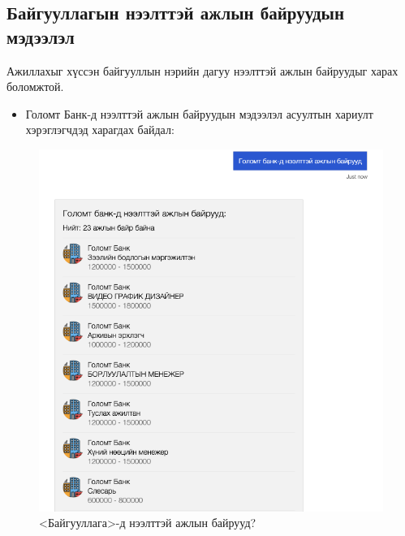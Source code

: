 \subsection{Байгууллагын нээлттэй ажлын байруудын мэдээлэл}
Ажиллахыг хүссэн байгууллын нэрийн дагуу нээлттэй ажлын байруудыг харах боломжтой.
\begin{itemize}
  \item Голомт Банк-д нээлттэй ажлын байруудын мэдээлэл асуултын хариулт хэрэглэгчдэд харагдах байдал:
\end{itemize}
\begin{figure}[ht]
  \centering
  \includegraphics[width=\textwidth-4cm]{images/question2.png}
  \caption{<Байгууллага>-д нээлттэй ажлын байрууд?}\label{fig:quest2}
\end{figure}
\newpage
